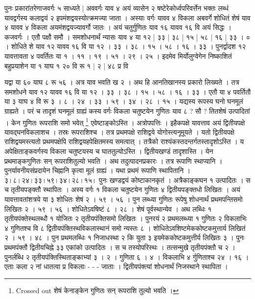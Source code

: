 \documentclass[11pt,a5paper]{book}
\begin{document}
{पुनः प्रकारांतरेणाजवर्गः ५ साध्यते | अववर्गः याव ४
अयं व्यासेन २ षष्टेरेकोर्ध्वपरिवर्त्तेन भक्तः लब्धं
यावद्वर्गस्य कलाद्वयं २ इपमंशद्वयस्योत्क्रमज्या जाता । अस्याः वर्गः यावव ४
विकला अबवर्गे शोधितं शेषं याव ४ यावव $\dot{४}$ विकला अयमंशद्वयज्यावर्गो
जातः । अयं चतुर्गुणितः याव १६ यावव $\dot{१६}$ वि अयं
सिद्धः । कजवर्गः । एतौ पक्षौ समौ । समशोधनार्थं न्यासः याव ४ या १२ |
३३ | ३८ | १५ | ५८ | १६ | ३३ । ० । 
शोधिते शे याव १२  यावव १६  वि या १२ । ३३ । ३८ । १५ । ५८ । १६ । ३३ ।  
पुनर्द्वादश १२ यावत्तावता ४ पवर्तितः या १ । ११ । १९ । ५१ । २९ । २५ ।
इदमेव मिर्योलुग्वेगेन निष्काशितं बहुप्रयाशेन
या १ याघ १ २० वि रू १ | २ | ४८ प्र वि 




यद्वा या ६० याघ ८ रू ५६ । अत्र याव भवति ख २ । 
अथ हि आनतिखानस्य प्रकारो लिख्यते । तत्र समशोधने याव १२ यावव १६ वि या १२ । ३३ । ३८ । १५ । ५८ । १६ । ३३ । 
एतौ या ४ पवर्तितौ या ३ याघ ४ वि रू ३ । ८ । २४ । ३३ । ५९ । ३४ । २८ । १५ । 
यद्यस्य रूपस्य घनो घनमूलं ग्राह्यते । परं च तादृशं घनमूलं ग्राह्यं कस्य वर्गः विकला चतुष्टयेन गुणितः याव ८ ? सौ ? 
तितशेषं उत्पादितां । केन गुणितः रूपराशि समो भवेत् \footnote{Crossed out शेषं केनाङ्केन गुणितः सन् रूपराशि तुल्यो भवति ।} 
एवेष्टाङ्कोऽस्ति । अत्रोपपत्तिः । इहैकपक्षे यावत्ताव अयं द्वितीयपक्षे यावद्घनविकलाशच । 
तस्रः रूपराशिश्च । तत्र प्रथमपक्षे राशिद्वये योगोस्त्यनूमूयते । यतो द्वितीयपक्षे राशिद्वयमस्त्यतो प्रथमपक्षेपि राशिद्वयहपेक्षितमस्य समत्वात् । 
तत्रैको राश्यंकस्तदन्तर्गतस्तादृशोऽस्ति । य अपेक्षिताङ्कवर्गस्य विकला चतुष्टयस्य च घाततुल्योऽस्ति । 
द्वितीयखण्डं तादृशास्ति । येन प्रथमाङ्कगुणितः सन् रूपराशितुल्यो भवति । 
अथ तदुत्पादनप्रकारः । तत्र रूपाणि स्थाप्यानि । पुनर्यावनीयसंप्रदायेन चिह्नानि कृत्वा मूलं ग्राह्यं । 
यथा प्रथमं रूपाणि स्थापितानि । $\dot{३} । ८ । २४ । \dot{३३} । ५९ । ३४ । \dot{२८} । १५ ।$ 
पुनः खण्डद्वयं कोष्टाकानकृतं । अत्रैकाङ्कघन १ उत्पादितः । स च तृतीयपङ्क्तौ स्थापितः । 
अस्य वर्गः १ विकला चतुष्टयेन गुणितः ४ द्वितीयपङ्क्तधो लिखितः । 
अयं यावत्तावतांशत्रये या ३ शोधितः शेषं २ । ५९ । ५६ । 
पुन लब्ध्या गुणितः रूपेषु शोधनार्थं प्रथमपन्तिसमो लिखितः २ । ५९ । ५६ । 
शोधितेऽवषिष्टं ८ । २८ । शेषं पूर्वस्थान्येव । अथ लब्धिः १ तृतीयपंक्तेस्थलब्धौ १ योजितः २ तृतीयपंक्तिसमो लिखितः । 
पुनरयं २ प्रथमलब्ध्या १ गुणितः २ विकलाभिः ४ गुणितश्च  वि ८ द्वितीयपंक्तिस्थविकलास्थानं समो न्यस्तः ८ । 
शोधितेऽवशिष्टमेककोष्टकमुत्तार्य लिखितं २ । ५९ । ४८ । पुन प्रथमलब्धिः १ निजाधस्था २ कि युता ३ इयमेककोष्टकमुत्तीर्य लिखितः ३ । 
पुनः प्रथमपंक्तौ द्वितीयचिह्ने ३३ एकांको उत्पादितः । स च तस्योपरिस्थः । तत्सन्मुखे तृतीयपंक्तौ च २ । 
पुनर्लब्धि २ तृतीयपंक्तिस्थिताङ्काभ्यां ३ । २ । गुणिता ६ । ४ । विकलाभि ४ र्गुणिताश्च २४ । १६ । 
एताः कला २ नां धातत्वा प्र विकलाः - - - जाताः । द्वितीयपंक्त्यां शोधनार्थं निजस्थाने स्थापिता । 
}
\end{document}
